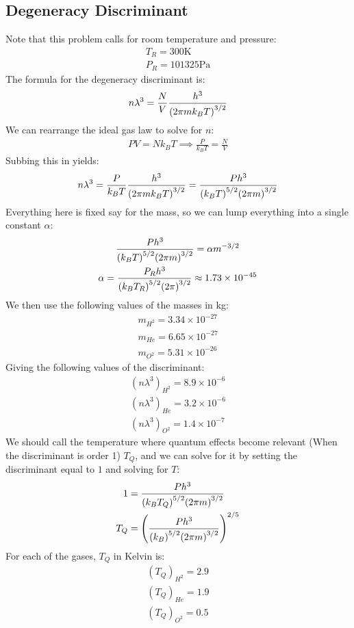 \documentclass[12pt]{article}
\begin{document}
\subsection{Degeneracy Discriminant}
Note that this problem calls for room temperature and pressure:
\begin{align*}
  T_R=300\text{K}\\
  P_R=101325\text{Pa}
\end{align*}
The formula for the degeneracy discriminant is:
\begin{align*}
  n\lambda^3=\frac{N}{V}\frac{h^3}{\qty(2\pi mk_BT)^{3/2}}
\end{align*}
We can rearrange the ideal gas law to solve for $n$:
\begin{align*}
  PV=Nk_BT\implies\frac{P}{k_BT}=\frac{N}{V}
\end{align*}
Subbing this in yields:
\begin{align*}
  n\lambda^3=\frac{P}{k_BT}\frac{h^3}{\qty(2\pi mk_BT)^{3/2}}=
  \frac{Ph^3}{\qty(k_BT)^{5/2}\qty(2\pi m)^{3/2}}
\end{align*}
Everything here is fixed say for the mass, so we can lump everything into a single constant $\alpha$:
\begin{gather*}
  \frac{Ph^3}{\qty(k_BT)^{5/2}\qty(2\pi m)^{3/2}}=\alpha m^{-3/2}\\
  \alpha=\frac{P_Rh^3}{\qty(k_BT_R)^{5/2}\qty(2\pi)^{3/2}}\approx
  1.73\times10^{-45}
\end{gather*}
We then use the following values of the masses in kg:
\begin{gather*}
  m_{H^2}=3.34\times10^{-27}\\
  m_{He}=6.65\times10^{-27}\\
  m_{O^2}=5.31\times10^{-26}
\end{gather*}
Giving the following values of the discriminant:
\begin{equation}
  \boxed{
    \begin{aligned}
      (n\lambda^3)_{H^2}=8.9\times10^{-6}\\
      (n\lambda^3)_{He}=3.2\times10^{-6}\\
      (n\lambda^3)_{O^2}=1.4\times10^{-7}
    \end{aligned}
  }
\end{equation}
We should call the temperature where quantum effects become relevant (When the discriminant is order 1) $T_Q$, and we can solve for it by setting the discriminant equal to $1$ and solving for $T$:
\begin{align*}
  1&=\frac{Ph^3}{\qty(k_BT_Q)^{5/2}\qty(2\pi m)^{3/2}}\\
  T_Q&=\qty(\frac{Ph^3}{\qty(k_B)^{5/2}\qty(2\pi m)^{3/2}})^{2/5}
\end{align*}
For each of the gases, $T_Q$ in Kelvin is:
\begin{equation}
\boxed{  \begin{aligned}
    (T_Q)_{H^2}=2.9\\
    (T_Q)_{He}=1.9\\
    (T_Q)_{O^2}=0.5
  \end{aligned}}
\end{equation}
\end{document}
